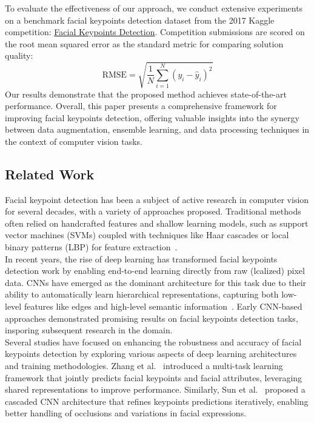 To evaluate the effectiveness of our approach, we conduct extensive experiments on a benchmark facial keypoints detection dataset from the 2017 Kaggle competition: \href{https://www.kaggle.com/competitions/facial-keypoints-detection/overview}{Facial Keypoints Detection}.  Competition submissions are scored on the root mean squared error as the standard metric for comparing solution quality:
\begin{equation}
	\text{RMSE} = \sqrt{\frac{1}{N} \sum_{i=1}^N \left(y_i - \hat{y}_i\right)^2}
\end{equation}
Our results demonstrate that the proposed method achieves state-of-the-art performance. Overall, this paper presents a comprehensive framework for improving facial keypoints detection, offering valuable insights into the synergy between data augmentation, ensemble learning, and data processing techniques in the context of computer vision tasks.

\subsection{Related Work}

Facial keypoint detection has been a subject of active research in computer vision for several decades, with a variety of approaches proposed.  Traditional methods often relied on handcrafted features and shallow learning models, such as support vector machines (SVMs) coupled with techniques like Haar cascades or local binary patterns (LBP) for feature extraction~\cite{VIOLAANDJONES2014, 1717463}. \\

In recent years, the rise of deep learning has transformed facial keypoints detection work by enabling end-to-end learning directly from raw (lcalized) pixel data.  CNNs have emerged as the dominant architecture for this task due to their ability to automatically learn hierarchical representations, capturing both low-level features like edges and high-level semantic information~\cite{LECUN2015NATURE}.  Early CNN-based approaches demonstrated promising results on facial keypoints detection tasks, insporing subsequent research in the domain.~\cite{10.1007/978-3-319-10599-4_7} \\

Several studies have focused on enhancing the robustness and accuracy of facial keypoints detection by exploring various aspects of deep learning architectures and training methodologies.  Zhang et al.~\cite{Zhang_2015} introduced a multi-task learning framework that jointly predicts facial keypoints and facial attributes, leveraging shared representations to improve performance. Similarly, Sun et al.~\cite{6619290} proposed a cascaded CNN architecture that refines keypoints predictions iteratively, enabling better handling of occlusions and variations in facial expressions.\\

